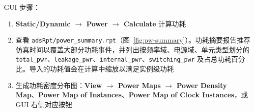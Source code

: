 GUI 步骤：
\begin{enumerate}
  \item \textbf{Static/Dynamic $\rightarrow$ Power $\rightarrow$ Calculate} 计算功耗
  \item 查看 \texttt{adsRpt/power\_summary.rpt}（图~\ref{fig:pw-summary}）。功耗摘要报告推荐  仿真时间以覆盖大部分功耗事件，并列出按频率域、电源域、单元类型划分的 \texttt{total\_pwr}、\texttt{leakage\_pwr}、\texttt{internal\_pwr}、\texttt{switching\_pwr} 及占总功耗百分比。导入的功耗值会在计算中缩放以满足实例级功耗
  \item 生成功耗密度分布图：\textbf{View $\rightarrow$ Power Maps $\rightarrow$ Power Density Map}、\textbf{Power Map of Instances}、\textbf{Power Map of Clock Instances}，或 GUI 右侧对应按钮
\end{enumerate}

